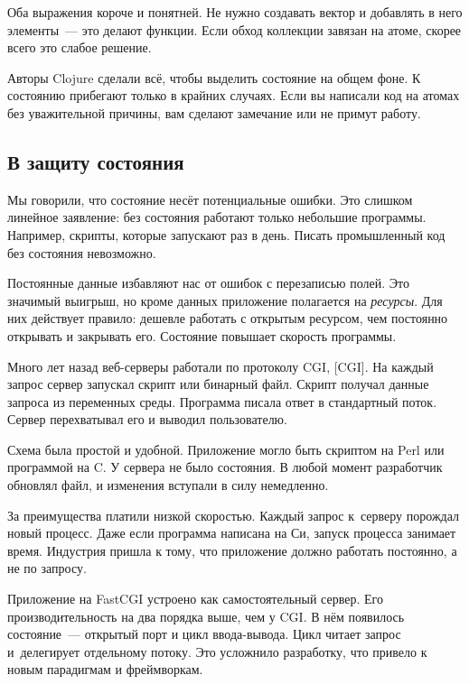 \fi

Оба выражения короче и понятней. Не нужно создавать вектор и добавлять в него
элементы~--- это делают функции. Если обход коллекции завязан на
атоме, скорее всего это слабое решение.

Авторы Clojure сделали всё, чтобы выделить состояние на общем фоне. К
состоянию прибегают только в крайних случаях. Если вы написали код на атомах без
уважительной причины, вам сделают замечание или не примут работу.


\subsection{В защиту состояния}

Мы говорили, что состояние несёт потенциальные ошибки. Это слишком линейное
заявление: без состояния работают только небольшие программы. Например, скрипты,
которые запускают раз в день. Писать промышленный код без состояния невозможно.


Постоянные данные избавляют нас от ошибок с перезаписью полей. Это значимый
выигрыш, но кроме данных приложение полагается на \emph{ресурсы}. Для них
действует правило: дешевле работать с открытым ресурсом, чем постоянно открывать
и закрывать его. Состояние повышает скорость программы.


Много лет назад веб-серверы работали по протоколу CGI,
[CGI].
На каждый запрос сервер запускал скрипт или бинарный файл. Скрипт получал данные
запроса из переменных среды. Программа писала ответ в стандартный поток. Сервер
перехватывал его и выводил пользователю.

Схема была простой и удобной. Приложение могло быть скриптом на Perl или
программой на C\Plus\Plus. У сервера не было состояния. В любой момент
разработчик обновлял файл, и изменения вступали в силу немедленно.

За преимущества платили низкой скоростью. Каждый запрос к~серверу порождал новый
процесс. Даже если программа написана на Си, запуск процесса занимает
время. Индустрия пришла к тому, что приложение должно работать постоянно, а не
по запросу.


Приложение на FastCGI устроено как самостоятельный сервер. Его
производительность на два порядка выше, чем у CGI. В нём появилось
состояние~--- открытый порт и цикл ввода-вывода. Цикл читает запрос и~делегирует
отдельному потоку. Это усложнило разработку, что привело к новым парадигмам
и фреймворкам.

